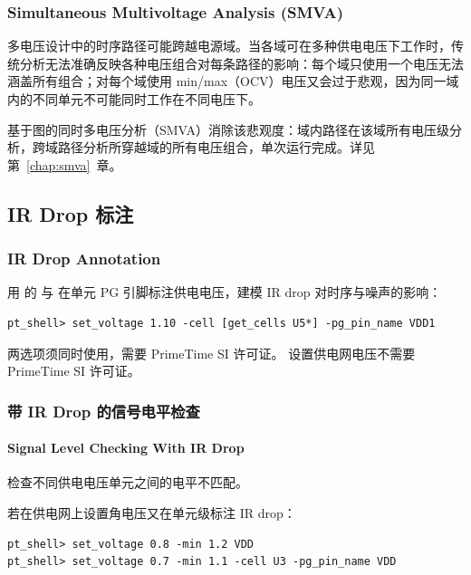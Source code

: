 \subsubsection*{Simultaneous Multivoltage Analysis (SMVA)}

多电压设计中的时序路径可能跨越电源域。当各域可在多种供电电压下工作时，传统分析无法准确反映各种电压组合对每条路径的影响：每个域只使用一个电压无法涵盖所有组合；对每个域使用 min/max（OCV）电压又会过于悲观，因为同一域内的不同单元不可能同时工作在不同电压下。

基于图的同时多电压分析（SMVA）消除该悲观度：域内路径在该域所有电压级分析，跨域路径分析所穿越域的所有电压组合，单次运行完成。详见第~\ref{chap:smva}~章。

\subsection{IR Drop 标注}
\subsubsection*{IR Drop Annotation}

用  的  与  在单元 PG 引脚标注供电电压，建模 IR drop 对时序与噪声的影响：
\begin{lstlisting}
pt_shell> set_voltage 1.10 -cell [get_cells U5*] -pg_pin_name VDD1
\end{lstlisting}

两选项须同时使用，需要 PrimeTime SI 许可证。 设置供电网电压不需要 PrimeTime SI 许可证。

\subsubsection{带 IR Drop 的信号电平检查}
\paragraph*{Signal Level Checking With IR Drop}

 检查不同供电电压单元之间的电平不匹配。

若在供电网上设置角电压又在单元级标注 IR drop：
\begin{lstlisting}
pt_shell> set_voltage 0.8 -min 1.2 VDD
pt_shell> set_voltage 0.7 -min 1.1 -cell U3 -pg_pin_name VDD
\end{lstlisting}


